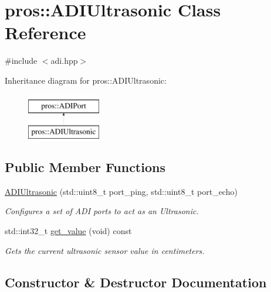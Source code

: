 \hypertarget{classpros_1_1ADIUltrasonic}{}\section{pros\+::A\+D\+I\+Ultrasonic Class Reference}
\label{classpros_1_1ADIUltrasonic}


{\ttfamily \#include $<$adi.\+hpp$>$}

Inheritance diagram for pros\+::A\+D\+I\+Ultrasonic\+:\begin{figure}[H]
\begin{center}
\leavevmode
\includegraphics[height=2.000000cm]{classpros_1_1ADIUltrasonic}
\end{center}
\end{figure}
\subsection*{Public Member Functions}
\begin{DoxyCompactItemize}
\item 
\mbox{\hyperlink{classpros_1_1ADIUltrasonic_ae2b4cd186556af9602cc0017d324494b}{A\+D\+I\+Ultrasonic}} (std\+::uint8\+\_\+t port\+\_\+ping, std\+::uint8\+\_\+t port\+\_\+echo)
\begin{DoxyCompactList}\small\item\em Configures a set of A\+DI ports to act as an Ultrasonic. \end{DoxyCompactList}\item 
std\+::int32\+\_\+t \mbox{\hyperlink{classpros_1_1ADIUltrasonic_ac79b5fd3ce67ae6ffc4b1fbbb306e997}{get\+\_\+value}} (void) const
\begin{DoxyCompactList}\small\item\em Gets the current ultrasonic sensor value in centimeters. \end{DoxyCompactList}\end{DoxyCompactItemize}


\subsection{Constructor \& Destructor Documentation}
\mbox{\label{classpros_1_1ADIUltrasonic_ae2b4cd186556af9602cc0017d324494b}} 
